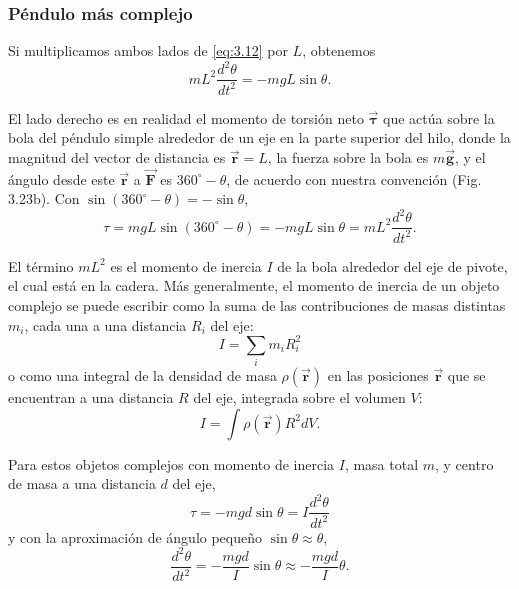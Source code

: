\documentclass[12pt]{book}
\begin{document}
\subsubsection*{Péndulo más complejo}

Si multiplicamos ambos lados de \eqref{eq:3.12} por $L$, obtenemos
\begin{equation}
m L^2 \frac{d^2\theta}{dt^2} = -m g L \sin\theta.
\label{eq:3.21}
\end{equation}

El lado derecho es en realidad el momento de torsión neto $\vec{\boldsymbol{\tau}}$ que actúa sobre la bola del péndulo simple alrededor de un eje en la parte superior del hilo, donde la magnitud del vector de distancia es $\vec{\mathbf{r}} = L$, la fuerza sobre la bola es $m \vec{\mathbf{g}}$, y el ángulo desde este $\vec{\mathbf{r}}$ a $\vec{\mathbf{F}}$ es $360^\circ - \theta$, de acuerdo con nuestra convención (Fig. 3.23b). Con $\sin(360^\circ - \theta) = -\sin\theta$,
\begin{equation}
\tau = m g L \sin(360^\circ - \theta) = -m g L \sin\theta = m L^2 \frac{d^2\theta}{dt^2}.
\label{eq:3.22}
\end{equation}

El término $m L^2$ es el momento de inercia $I$ de la bola alrededor del eje de pivote, el cual está en la cadera. Más generalmente, el momento de inercia de un objeto complejo se puede escribir como la suma de las contribuciones de masas distintas $m_i$, cada una a una distancia $R_i$ del eje:
\begin{equation}
I = \sum_{i} m_i R_i^2
\label{eq:3.23}
\end{equation}
o como una integral de la densidad de masa $\rho(\vec{\mathbf{r}})$ en las posiciones $\vec{\mathbf{r}}$ que se encuentran a una distancia $R$ del eje, integrada sobre el volumen $V$:
\begin{equation}
I = \int \rho(\vec{\mathbf{r}}) R^2 dV.
\label{eq:3.24}
\end{equation}

Para estos objetos complejos con momento de inercia $I$, masa total $m$, y centro de masa a una distancia $d$ del eje,
\begin{equation}
\tau = -m g d \sin\theta = I \frac{d^2\theta}{dt^2}
\label{eq:3.25}
\end{equation}
y con la aproximación de ángulo pequeño $\sin\theta \approx \theta$,
\begin{equation}
\frac{d^2\theta}{dt^2} = -\frac{m g d}{I} \sin\theta \approx -\frac{m g d}{I} \theta.
\label{eq:3.26}
\end{equation}
\end{document}
